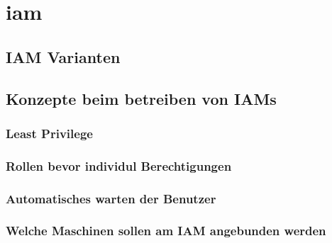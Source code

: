 \chapter{\acrfull{iam}}

\section{IAM Varianten}


\section{Konzepte beim betreiben von IAMs}
\subsection{Least Privilege}

\subsection{Rollen bevor individul Berechtigungen}

\subsection{Automatisches warten der Benutzer}

\subsection{Welche Maschinen sollen am IAM angebunden werden}